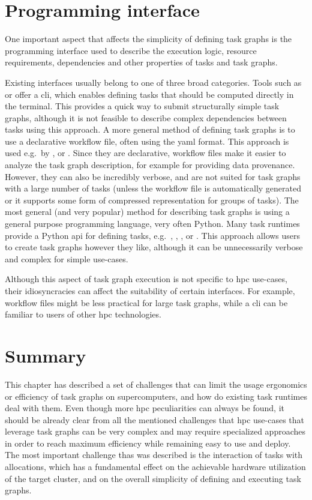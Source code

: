 \section{Programming interface}
One important aspect that affects the simplicity of defining task graphs is
the programming interface used to describe the execution logic, resource
requirements, dependencies and other properties of tasks and task graphs.

Existing interfaces usually belong to one of three broad categories. Tools such as \gnuparallel{} or \hypershell{}
offer a \gls{cli}, which enables defining tasks that should be computed directly in the
terminal. This provides a quick way to submit structurally simple task graphs, although it is
not feasible to describe complex dependencies between tasks using this approach. A more general
method of defining task graphs is to use a declarative workflow file, often using the \gls{yaml}
format. This approach is used e.g.\ by \pegasus{}, \autosubmit{} or \merlin{}. Since they
are declarative, workflow files make it easier to analyze the task graph description, for
example for providing data provenance. However, they can also be incredibly verbose, and are not
suited for task graphs with a large number of tasks (unless the workflow file is automatically
generated or it supports some form of compressed representation for groups of tasks). The most
general (and very popular) method for describing task graphs is using a general purpose
programming language, very often Python. Many task runtimes provide a Python \gls{api} for
defining tasks, e.g.\ \dask{}, \ray{}, \parsl{}, \balsam{} or \pegasus{}. This approach allows
users to create task graphs however they like, although it can be unnecessarily verbose and complex
for simple use-cases.

Although this aspect of task graph execution is not specific to \gls{hpc} use-cases, their
idiosyncracies can affect the suitability of certain interfaces. For example, workflow files
might be less practical for large task graphs, while a \gls{cli} can be familiar to users of
other \gls{hpc} technologies.

\section*{Summary}
This chapter has described a set of challenges that can limit the usage ergonomics or efficiency
of task graphs on supercomputers, and how do existing task runtimes deal with them.
Even though more \gls{hpc} peculiarities can always be found, it should be
already clear from all the mentioned challenges that \gls{hpc} use-cases that
leverage task graphs can be very complex and may require specialized approaches in order to reach
maximum efficiency while remaining easy to use and deploy. The most important challenge thas was
described is the interaction of tasks with allocations, which has a fundamental effect on the
achievable hardware utilization of the target cluster, and on the overall simplicity of defining
and executing task graphs.

